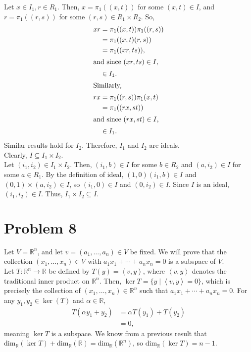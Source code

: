 \documentclass[8pt]{extarticle}
\newcommand{\R}{\mathbb{R}}
\newcommand{\iprod}[2]{\left\langle #1,#2\right\rangle}
\begin{document}
  Let $x\in I_1,r\in R_1$. Then, $x = \pi_1((x,t))$ for some $(x,t)\in I$, and $r = \pi_1((r,s))$ for some $(r,s)\in R_1\times R_2$. So,
  \begin{align*}
    xr &= \pi_1((x,t))\pi_1((r,s))\\
       &= \pi_1((x,t)(r,s))\\
       &= \pi_1((xr,ts)),\\
       \intertext{and since $(xr,ts)\in I$,}
       &\in I_1.\\
       \intertext{Similarly,}
    rx &= \pi_1((r,s))\pi_1(x,t)\\
       &= \pi_1((rx,st))\\
       \intertext{and since $(rx,st)\in I$,}
       &\in I_1.
  \end{align*}
  Similar results hold for $I_2$. Therefore, $I_1$ and $I_2$ are ideals.\\

  Clearly, $I\subseteq I_1\times I_2$.\\

  Let $(i_1,i_2)\in I_1\times I_2$. Then, $(i_1,b)\in I$ for some $b\in R_2$ and $(a,i_2)\in I$ for some $a\in R_1$. By the definition of ideal, $(1,0)(i_1,b)\in I$ and $(0,1)\times(a,i_2)\in I$, so $(i_1,0)\in I$ and $(0,i_2)\in I$. Since $I$ is an ideal, $(i_1,i_2)\in I$. Thus, $I_1\times I_2\subseteq I$.
  \section{Problem 8}%
  Let $V = \R^{n}$, and let $v = (a_1,\dots,a_n)\in V$ be fixed. We will prove that the collection $(x_1,\dots,x_n) \in V$ with $a_1x_1 + \cdots + a_nx_n = 0$ is a subspace of $V$.\\

  Let $T: \R^{n}\rightarrow \R$ be defined by $T(y) = \iprod{v}{y}$, where $\iprod{v}{y}$ denotes the traditional inner product on $\R^n$. Then, $\ker T = \{y\mid \iprod{v}{y} = 0\}$, which is precisely the collection of $(x_1,\dots,x_n)\in \R^n$ such that $a_1x_1 + \cdots + a_nx_n = 0$. For any $y_1,y_2\in \ker(T)$ and $\alpha\in \R$,
  \begin{align*}
    T(\alpha y_1 + y_2) &= \alpha T(y_1) + T(y_2)\\
                        &= 0,
  \end{align*}
  meaning $\ker T$ is a subspace. We know from a previous result that $\text{dim}_{\R}(\ker T) + \text{dim}_{\R}(\R) = \text{dim}_{\R}(\R^n)$, so $\text{dim}_{\R}(\ker T) = n-1$.\\
\end{document}
